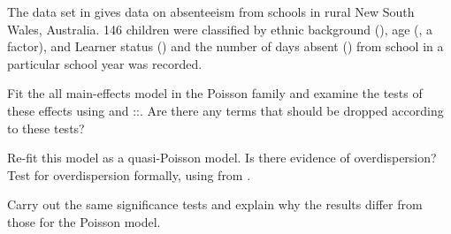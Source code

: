 \documentclass[11pt]{book}\usepackage[]{graphicx}\usepackage[]{color}
\begin{document}
\begin{Exercises}
  
  \exercise The data set  in  gives data on absenteeism from schools in rural New South Wales, Australia.
   146 children were classified by ethnic background (), age (, a factor),  and Learner status ()
   and the number of days absent () from school
   in a particular school year was recorded.
   \begin{enumerate*}
    \item Fit the all main-effects model in the Poisson family and examine the tests of these effects using
     and ::.  Are there any terms that should be dropped according to these tests?
    \item Re-fit this model as a quasi-Poisson model.  Is there evidence of overdispersion?
    Test for overdispersion formally, using  from .
    \item Carry out the same significance tests and explain why the results differ from those for the Poisson model.
   \end{enumerate*}


\end{Exercises}
\end{document}
